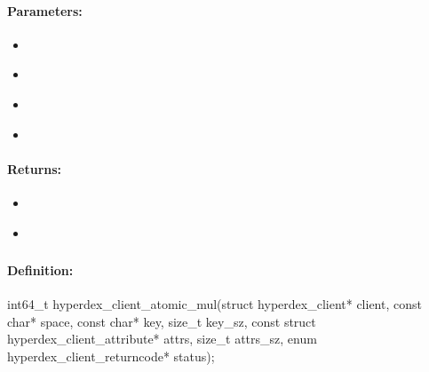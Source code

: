 \paragraph{Parameters:}
\begin{itemize}[noitemsep]
\item {}\\

\item {}\\

\item {}\\

\item {}\\

\end{itemize}

\paragraph{Returns:}
\begin{itemize}[noitemsep]
\item {}\\

\item {}\\

\end{itemize}

\pagebreak
\subsubsection{}
\label{api:c:atomic_mul}


\paragraph{Definition:}
\begin{ccode}
int64_t hyperdex_client_atomic_mul(struct hyperdex_client* client,
        const char* space,
        const char* key, size_t key_sz,
        const struct hyperdex_client_attribute* attrs, size_t attrs_sz,
        enum hyperdex_client_returncode* status);
\end{ccode}

